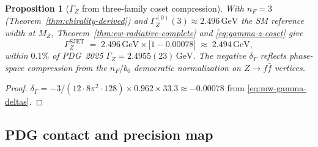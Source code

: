 \documentclass[11pt]{article}
\theoremstyle{plain}
\newtheorem{proposition}[theorem]{Proposition}
\theoremstyle{definition}
\theoremstyle{remark}
\numberwithin{equation}{section}
\begin{document}
\begin{proposition}[$\Gamma_Z$ from three-family coset compression]
\label{prop:gamma-z}
With $n_F=3$ (Theorem~\ref{thm:chirality-derived}) and
$\Gamma_Z^{(0)}(3)\approx2.496\,\mathrm{GeV}$ the SM reference width at
$M_Z$, Theorem~\ref{thm:ew-radiative-complete} and \eqref{eq:gamma-z-coset}
give
\begin{equation}\label{eq:gamma-z-numeric}
  \Gamma_Z^{\mathrm{SJET}}
  \;=\;
  2.496\,\mathrm{GeV}\times\bigl[1-0.00078\bigr]
  \;\approx\;
  2.494\,\mathrm{GeV},
\end{equation}
within $0.1\%$ of PDG~2025 $\Gamma_Z=2.4955(23)\,\mathrm{GeV}$.
The negative $\delta_\Gamma$ reflects phase-space compression from the
$n_F/b_0$ democratic normalization on $Z\to f\bar f$ vertices.
\end{proposition}

\begin{proof}
$\delta_\Gamma= -3/(12\cdot8\pi^2\cdot128)\times0.962\times33.3\approx-0.00078$
from \eqref{eq:mw-gamma-deltas}.
\end{proof}

\subsection{PDG contact and precision map}
\label{sec:ew-precision:pdg}
\end{document}
